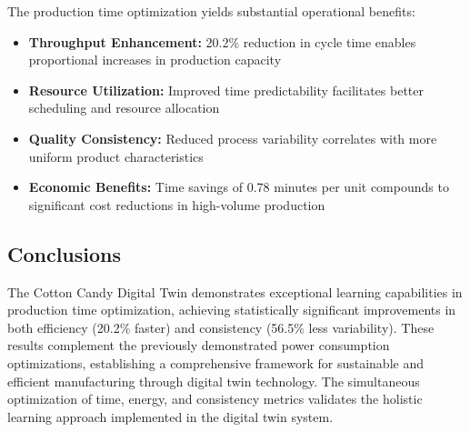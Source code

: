 The production time optimization yields substantial operational benefits:

\begin{itemize}
\item \textbf{Throughput Enhancement:} 20.2\% reduction in cycle time enables proportional increases in production capacity
\item \textbf{Resource Utilization:} Improved time predictability facilitates better scheduling and resource allocation
\item \textbf{Quality Consistency:} Reduced process variability correlates with more uniform product characteristics
\item \textbf{Economic Benefits:} Time savings of 0.78 minutes per unit compounds to significant cost reductions in high-volume production
\end{itemize}

\subsection{Conclusions}

The Cotton Candy Digital Twin demonstrates exceptional learning capabilities in production time optimization, achieving statistically significant improvements in both efficiency (20.2\% faster) and consistency (56.5\% less variability). These results complement the previously demonstrated power consumption optimizations, establishing a comprehensive framework for sustainable and efficient manufacturing through digital twin technology. The simultaneous optimization of time, energy, and consistency metrics validates the holistic learning approach implemented in the digital twin system.